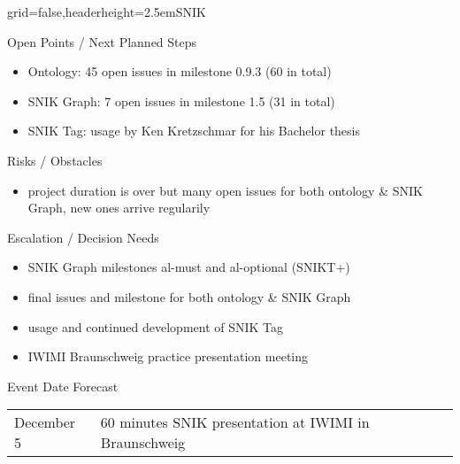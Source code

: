 \documentclass[english]{kiesgrube}
\begin{document}
\begin{poster}{grid=false,headerheight=2.5em}{}{SNIK}{}{}
\begin{posterbox}[name=open,column=1,below=description]{Open Points / Next Planned Steps}
\footnotesize
\begin{itemize}
\item Ontology: 45 open issues in milestone 0.9.3 (60 in total)
\item SNIK Graph: 7 open issues in milestone 1.5 (31 in total)
\item SNIK Tag: usage by Ken Kretzschmar for his Bachelor thesis
\end{itemize}
\end{posterbox}
\begin{posterbox}[name=risks,column=1,below=open]{Risks / Obstacles}
\begin{itemize}
\item project duration is over but many open issues for both ontology \& SNIK Graph, new ones arrive regularily
\end{itemize}
\end{posterbox}
\begin{posterbox}[name=escalation,column=1,below=risks]{Escalation / Decision Needs}
\footnotesize
\begin{itemize}
\item SNIK Graph milestones al-must and al-optional (SNIKT+)
\item final issues and milestone for both ontology \& SNIK Graph
\item usage and continued development of SNIK Tag
\item IWIMI Braunschweig practice presentation meeting
\end{itemize}
\end{posterbox}
\begin{posterbox}[name=event,column=1,below=escalation]{Event Date Forecast}
\small
\begin{tabulary}{\textwidth}{lL}
December 5	&60 minutes SNIK presentation at IWIMI in Braunschweig\\
\end{tabulary}
\end{posterbox}
\footer{}
\end{poster}

\newpage
\end{document}
